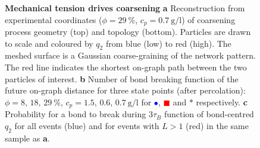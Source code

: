 \begin{figure}
\caption{\textbf{Mechanical tension drives coarsening} 
\textbf{a} Reconstruction from experimental coordinates ($\phi=29~\%$, $c_p=\SI{0.7}{\gram\per\litre}$) of coarsening process geometry (top) and topology (bottom). Particles are drawn to scale and coloured by $q_2$ from blue (low) to red (high). The meshed surface is a Gaussian coarse-graining of the network pattern. The red line indicates the shortest on-graph path between the two particles of interest. 
\textbf{b} Number of bond breaking function of the future on-graph distance for three state points (after percolation): $\phi=8,\,18,\,29~\%$, $c_p=1.5,\,0.6,\,\SI{0.7}{\gram\per\litre}$ for \textcolor{blue}{$\bullet$}, \textcolor{red}{\tiny$\blacksquare$} and $*$ respectively.
\textbf{c} Probability for a bond to break during $3\tau_B$ function of bond-centred $q_2$ for all events (blue) and for events with $L>1$ (red) in the same sample as \textbf{a}.
}
\label{fig:breaking}
\end{figure}


